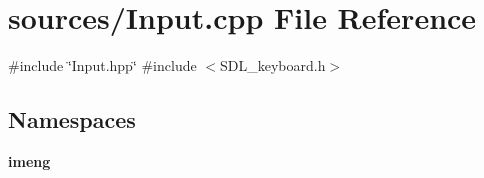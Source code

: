 \section{sources/\+Input.cpp File Reference}
\label{_input_8cpp}
{\ttfamily \#include \char`\"{}Input.\+hpp\char`\"{}}\newline
{\ttfamily \#include $<$S\+D\+L\+\_\+keyboard.\+h$>$}\newline
\subsection*{Namespaces}
\begin{DoxyCompactItemize}
\item 
 \textbf{ imeng}
\end{DoxyCompactItemize}
